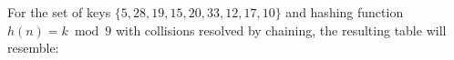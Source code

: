 For the set of keys $ \{5, 28, 19, 15, 20, 33, 12, 17, 10\} $ and hashing function $ h(n) = k \bmod 9 $ with collisions resolved by chaining, the resulting table will resemble:
\begin{center}
	\renewcommand{\arraystretch}{1.2}
\end{center}